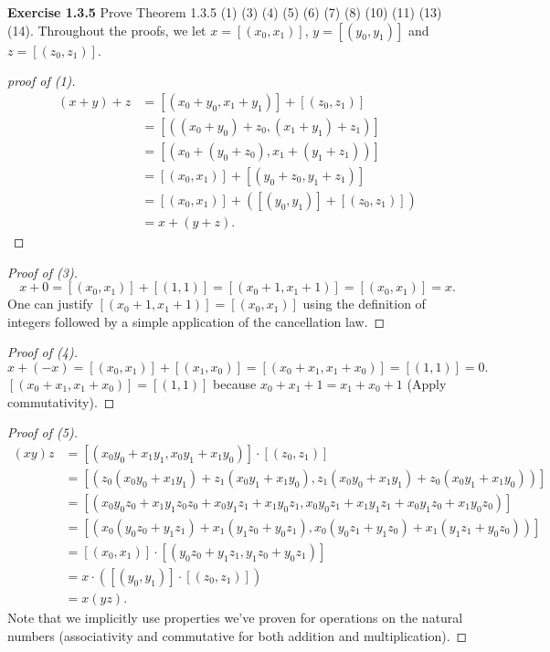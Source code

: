 \newpage
\noindent \textbf{Exercise 1.3.5} Prove Theorem 1.3.5 (1) (3) (4) (5) (6) (7) (8) (10) (11) (13) (14).
Throughout the proofs, we let \(x = [(x_0, x_1)]\), \(y = [(y_0, y_1)]\) and \(z = [(z_0, z_1)]\).
\begin{proof}[proof of (1)]
    \begin{align*}
        (x+y)+z &= [(x_0 + y_0, x_1 + y_1)] + [(z_0, z_1)]\\
        &= [((x_0 + y_0) + z_0, (x_1 + y_1) + z_1)]\\
        &= [(x_0 + (y_0 + z_0), x_1 + (y_1 + z_1))]\\
        &= [(x_0, x_1)] + [(y_0 + z_0, y_1 + z_1)]\\
        &= [(x_0, x_1)] + ([(y_0, y_1)] + [(z_0, z_1)])\\
        &= x + (y+z).
    \end{align*}
\end{proof}
\begin{proof}[Proof of (3)]
    \[x + 0 = [(x_0, x_1)] + [(1,1)] = [(x_0 + 1, x_1 + 1)] = [(x_0, x_1)] = x.\]
    One can justify \([(x_0+1, x_1 + 1)] = [(x_0, x_1)]\) using the definition of integers followed by a simple application of the cancellation law.
\end{proof}
\begin{proof}[Proof of (4)]
    \[x + (-x) = [(x_0, x_1)] + [(x_1, x_0)] = [(x_0+x_1, x_1+x_0)] = [(1,1)] = 0.\]
    \([(x_0+x_1, x_1+x_0)] = [(1,1)]\) because \(x_0 + x_1 + 1 = x_1 + x_0 + 1\) (Apply commutativity).
\end{proof}
\begin{proof}[Proof of (5)]
    \begin{align*}
        (xy)z &= [(x_0y_0+x_1y_1, x_0y_1+x_1y_0)] \cdot [(z_0, z_1)] \\
        &= [(z_0(x_0y_0+x_1y_1) + z_1(x_0y_1 + x_1y_0), z_1(x_0y_0 + x_1y_1) + z_0(x_0y_1+x_1y_0))]\\
        &= [(x_0y_0z_0 + x_1y_1z_0z_0 + x_0y_1z_1 + x_1y_0z_1, x_0y_0z_1 + x_1y_1z_1 + x_0y_1z_0 + x_1y_0z_0)]\\
        &= [(x_0(y_0z_0 + y_1z_1) + x_1(y_1z_0 + y_0z_1), x_0(y_0z_1 + y_1z_0) + x_1(y_1z_1 + y_0z_0))]\\
        &= [(x_0, x_1)] \cdot [(y_0z_0 + y_1z_1, y_1z_0 + y_0z_1)]\\
        &= x \cdot ([(y_0, y_1)] \cdot [(z_0, z_1)])\\
        &= x(yz).
    \end{align*}
    Note that we implicitly use properties we've proven for operations on the natural numbers (associativity and commutative for both addition and multiplication).
\end{proof}
